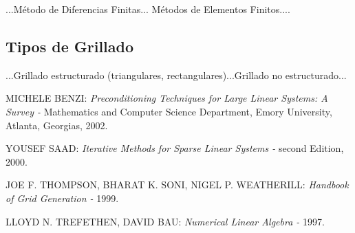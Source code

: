 \documentclass[11pt,letterpaper]{article}
\begin{document}
...Método de Diferencias Finitas... Métodos de Elementos Finitos....

\subsection{Tipos de Grillado}

...Grillado estructurado (triangulares, rectangulares)...Grillado no estructurado...


\begin{thebibliography}{10}
MICHELE BENZI:
\textit{Preconditioning Techniques for Large Linear
Systems: A Survey - }
Mathematics and Computer Science Department, Emory University, Atlanta, Georgias, 2002.
 
YOUSEF SAAD:
\textit{Iterative Methods for Sparse Linear Systems - } 
second Edition, 2000.
 
JOE F. THOMPSON, BHARAT K. SONI, NIGEL P. WEATHERILL:
\textit{Handbook of Grid Generation - }
1999.

LLOYD N. TREFETHEN, DAVID BAU:
\textit{Numerical Linear Algebra - }
1997.

\end{thebibliography}
\end{document}
